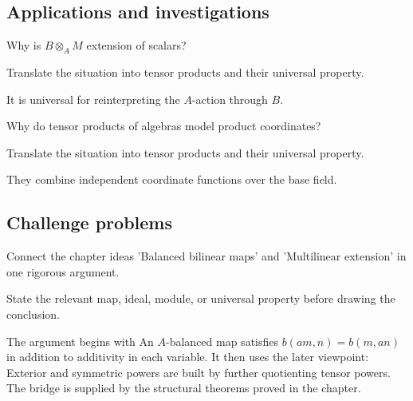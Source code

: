 \subsection*{Applications and investigations}

\begin{exercise}\label{exr:v10-expand-13}
Why is $B\otimes_AM$ extension of scalars?
\end{exercise}
\begin{hint}
Translate the situation into tensor products and their universal property.
\end{hint}
\begin{solution}
It is universal for reinterpreting the $A$-action through $B$.
\end{solution}

\begin{exercise}\label{exr:v10-expand-14}
Why do tensor products of algebras model product coordinates?
\end{exercise}
\begin{hint}
Translate the situation into tensor products and their universal property.
\end{hint}
\begin{solution}
They combine independent coordinate functions over the base field.
\end{solution}

\subsection*{Challenge problems}

\begin{exercise}\label{exr:v10-expand-15}
Connect the chapter ideas 'Balanced bilinear maps' and 'Multilinear extension' in one rigorous argument.
\end{exercise}
\begin{hint}
State the relevant map, ideal, module, or universal property before drawing the conclusion.
\end{hint}
\begin{solution}
The argument begins with An $A$-balanced map satisfies $b(am,n)=b(m,an)$ in addition to additivity in each variable. It then uses the later viewpoint: Exterior and symmetric powers are built by further quotienting tensor powers. The bridge is supplied by the structural theorems proved in the chapter.
\end{solution}

